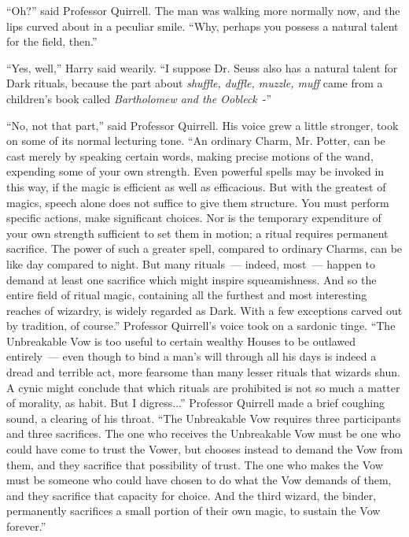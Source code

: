 ``Oh?'' said Professor Quirrell. The man was walking more normally now, and the lips curved about in a peculiar smile. ``Why, perhaps you possess a natural talent for the field, then.''

``Yes, well,'' Harry said wearily. ``I suppose Dr. Seuss also has a natural talent for Dark rituals, because the part about \emph{shuffle, duffle, muzzle, muff} came from a children's book called \emph{Bartholomew and the Oobleck}~-''

``No, not that part,'' said Professor Quirrell. His voice grew a little stronger, took on some of its normal lecturing tone. ``An ordinary Charm, Mr. Potter, can be cast merely by speaking certain words, making precise motions of the wand, expending some of your own strength. Even powerful spells may be invoked in this way, if the magic is efficient as well as efficacious. But with the greatest of magics, speech alone does not suffice to give them structure. You must perform specific actions, make significant choices. Nor is the temporary expenditure of your own strength sufficient to set them in motion; a ritual requires permanent sacrifice. The power of such a greater spell, compared to ordinary Charms, can be like day compared to night. But many rituals~--- indeed, most~--- happen to demand at least one sacrifice which might inspire squeamishness. And so the entire field of ritual magic, containing all the furthest and most interesting reaches of wizardry, is widely regarded as Dark. With a few exceptions carved out by tradition, of course.'' Professor Quirrell's voice took on a sardonic tinge. ``The Unbreakable Vow is too useful to certain wealthy Houses to be outlawed entirely~--- even though to bind a man's will through all his days is indeed a dread and terrible act, more fearsome than many lesser rituals that wizards shun. A cynic might conclude that which rituals are prohibited is not so much a matter of morality, as habit. But I digress...'' Professor Quirrell made a brief coughing sound, a clearing of his throat. ``The Unbreakable Vow requires three participants and three sacrifices. The one who receives the Unbreakable Vow must be one who could have come to trust the Vower, but chooses instead to demand the Vow from them, and they sacrifice that possibility of trust. The one who makes the Vow must be someone who could have chosen to do what the Vow demands of them, and they sacrifice that capacity for choice. And the third wizard, the binder, permanently sacrifices a small portion of their own magic, to sustain the Vow forever.''

